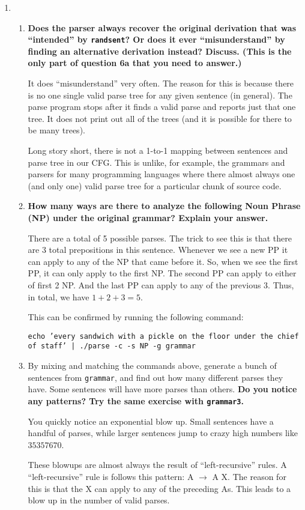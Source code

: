 \documentclass[10pt]{article}
\begin{document}
\begin{enumerate}
\item\begin{enumerate}
 \item {\bf Does the parser
  always recover the original derivation that was ``intended'' by
  \verb|randsent|? Or does it ever ``misunderstand'' by finding an alternative
  derivation instead?  Discuss. (This is the only part of question 6a
  that you need to answer.)}

It does ``misunderstand'' very often. The reason for this is because there is no one single valid parse tree for any given sentence (in general). The parse program stops after it finds a valid parse and reports just that one tree. It does not print out all of the trees (and it is possible for there to be many trees).

Long story short, there is not a 1-to-1 mapping between sentences and parse tree in our CFG. This is unlike, for example, the grammars and parsers for many programming languages where there almost always one (and only one) valid parse tree for a particular chunk of source code.

\item {\bf How many ways are there to analyze the following Noun Phrase (NP)
  under the original grammar?  Explain your answer.}

There are a total of 5 possible parses. The trick to see this is that there are 3 total prepositions in this sentence. Whenever we see a new PP it can apply to any of the NP that came before it. So, when we see the first PP, it can only apply to the first NP. The second PP can apply to either of first 2 NP. And the last PP can apply to any of the previous 3. Thus, in total, we have $1 + 2 + 3 = 5$.

This can be confirmed by running the following command:

{\tt echo 'every sandwich with a pickle on the floor under the chief of staff' | ./parse -c -s NP -g grammar}

\item By mixing and matching the commands above, generate a bunch of
  sentences from \verb|grammar|, and find out how many different parses they
  have. Some sentences will have more parses than others. {\bf Do you
  notice any patterns? Try the same exercise with \verb|grammar3|.}

You quickly notice an exponential blow up. Small sentences have a handful of parses, while larger sentences jump to crazy high numbers like $35357670$.

These blowups are almost always the result of ``left-recursive'' rules. A ``left-recursive'' rule is follows this pattern: A $\rightarrow$ A X. The reason for this is that the X can apply to any of the preceding As. This leads to a blow up in the number of valid parses.


\end{enumerate}
\end{enumerate}
\end{document}
